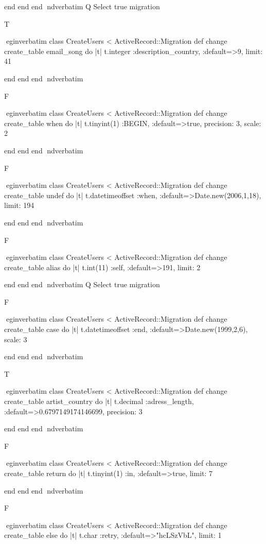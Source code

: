     end 
  end 
end
nd{verbatim}
Q
 Select true migration

T

egin{verbatim}
 class CreateUsers < ActiveRecord::Migration 
  def change 
    create_table email_song do |t| 
      t.integer :description_country, :default=>9, limit: 41
    
    end 
  end 
end
nd{verbatim}

F

egin{verbatim}
 class CreateUsers < ActiveRecord::Migration 
  def change 
    create_table when do |t| 
      t.tinyint(1) :BEGIN, :default=>true, precision: 3, scale: 2
    
    end 
  end 
end
nd{verbatim}

F

egin{verbatim}
 class CreateUsers < ActiveRecord::Migration 
  def change 
    create_table undef do |t| 
      t.datetimeoffset :when, :default=>Date.new(2006,1,18), limit: 194
    
    end 
  end 
end
nd{verbatim}

F

egin{verbatim}
 class CreateUsers < ActiveRecord::Migration 
  def change 
    create_table alias do |t| 
      t.int(11) :self, :default=>191, limit: 2
    
    end 
  end 
end
nd{verbatim}
Q
 Select true migration

F

egin{verbatim}
 class CreateUsers < ActiveRecord::Migration 
  def change 
    create_table case do |t| 
      t.datetimeoffset :end, :default=>Date.new(1999,2,6), scale: 3
    
    end 
  end 
end
nd{verbatim}

T

egin{verbatim}
 class CreateUsers < ActiveRecord::Migration 
  def change 
    create_table artist_country do |t| 
      t.decimal :adress_length, :default=>0.6797149174146699, precision: 3
    
    end 
  end 
end
nd{verbatim}

F

egin{verbatim}
 class CreateUsers < ActiveRecord::Migration 
  def change 
    create_table return do |t| 
      t.tinyint(1) :in, :default=>true, limit: 7
    
    end 
  end 
end
nd{verbatim}

F

egin{verbatim}
 class CreateUsers < ActiveRecord::Migration 
  def change 
    create_table else do |t| 
      t.char :retry, :default=>"hcLSzVbL", limit: 1
    
